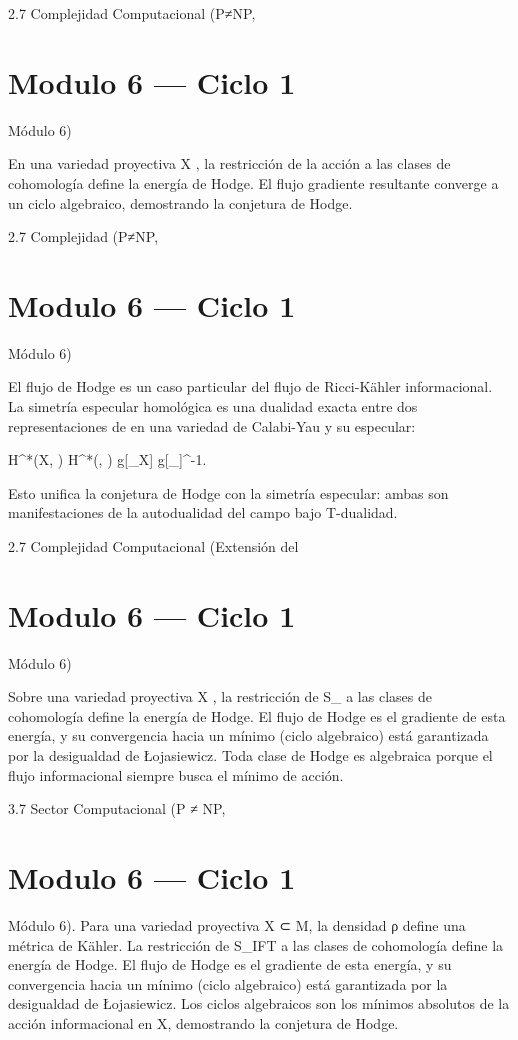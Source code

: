 \documentclass[12pt,twoside]{book}
\begin{document}
2.7 Complejidad Computacional (P≠NP, 

\chapter{Modulo 6 — Ciclo 1}
Módulo 6)

En una variedad proyectiva  X , la restricción de la acción a las clases de cohomología define la energía de Hodge. El flujo gradiente resultante converge a un ciclo algebraico, demostrando la conjetura de Hodge.

2.7 Complejidad (P≠NP, 

\chapter{Modulo 6 — Ciclo 1}
Módulo 6)

El flujo de Hodge es un caso particular del flujo de Ricci-Kähler informacional. La simetría especular homológica es una dualidad exacta entre dos representaciones de  \rho  en una variedad de Calabi-Yau y su especular:

H^*(X, ) \cong H^*(, ) \quad {} \quad g[\rho_X] \leftrightarrow g[\rho_{}]^{-1}.

Esto unifica la conjetura de Hodge con la simetría especular: ambas son manifestaciones de la autodualidad del campo  \rho  bajo T-dualidad.

2.7 Complejidad Computacional (Extensión del 

\chapter{Modulo 6 — Ciclo 1}
Módulo 6)

Sobre una variedad proyectiva  X , la restricción de  S_{}  a las clases de cohomología define la energía de Hodge. El flujo de Hodge es el gradiente de esta energía, y su convergencia hacia un mínimo (ciclo algebraico) está garantizada por la desigualdad de Łojasiewicz. Toda clase de Hodge es algebraica porque el flujo informacional siempre busca el mínimo de acción.

3.7 Sector Computacional (P ≠ NP, 

\chapter{Modulo 6 — Ciclo 1}
Módulo 6).
Para una variedad proyectiva X ⊂ M, la densidad ρ define una métrica de Kähler. La restricción de S_IFT a las clases de cohomología define la energía de Hodge. El flujo de Hodge es el gradiente de esta energía, y su convergencia hacia un mínimo (ciclo algebraico) está garantizada por la desigualdad de Łojasiewicz. Los ciclos algebraicos son los mínimos absolutos de la acción informacional en X, demostrando la conjetura de Hodge.
\end{document}
